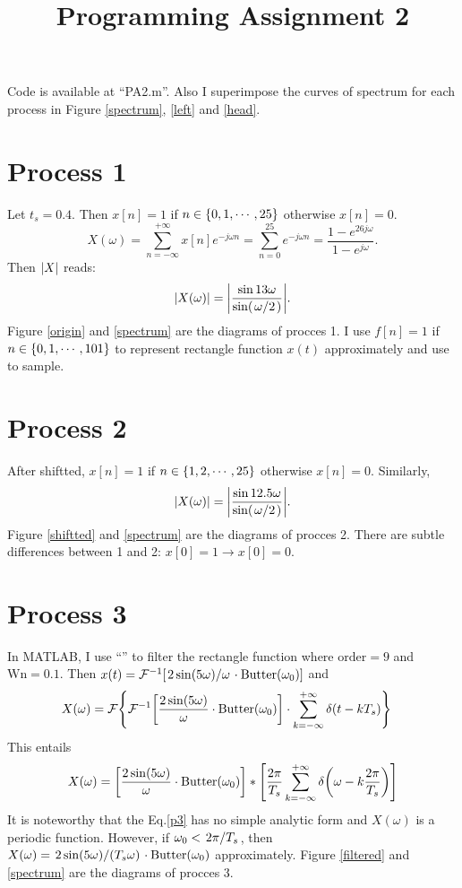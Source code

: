 \documentclass{article}
\begin{document}
\title{Programming Assignment 2}
Code is available at ``PA2.m''. Also I superimpose the curves of spectrum for each process in Figure \ref{spectrum}, \ref{left} and \ref{head}.

\section*{Process 1}
Let $t_s=0.4$. Then $x[n]=1$ if $n\in\qty{0,1,\cdots, 25}$ otherwise $x[n]=0$.
\[
	X(\omega)
	=
	\sum_{n=-\infty}^{+\infty} x[n]e^{-j\omega n}
	=
	\sum_{n=0}^{25} e^{-j\omega n}
	=
	\frac{1-e^{26j\omega}}{1-e^{j\omega}}
.\] 
Then $\qty|X|$ reads:
 \[
	 \abs{X(\omega)}=
	 \qty|\frac{\sin{13\omega}}{\sin(\flatfrac{\omega}{2})}|
.\] 
Figure \ref{origin} and \ref{spectrum} are the diagrams of procces 1. I use $f[n]=1$ if $n\in\qty{0,1,\cdots, 101}$ to represent rectangle function $x(t)$ approximately and use  to sample.


\section*{Process 2}
After shiftted, $x[n]=1$ if $n\in\qty{1,2, \cdots, 25}$ otherwise $x[n]=0$.
Similarly,
\[
	\abs{X(\omega)}=
	\qty|\frac{\sin{12.5\omega}}{\sin(\flatfrac{\omega}{2})}|
.\] 
Figure \ref{shiftted} and \ref{spectrum} are the diagrams of procces 2. There are subtle differences between 1 and 2: $x[0]=1\to x[0]=0$.


\section*{Process 3}
In MATLAB, I use ``'' to filter the rectangle function where $\mathrm{order}=9$ and  $\mathrm{Wn}=0.1$. Then $x(t)=\+F^{-1}\qty[\flatfrac{2\sin(5\omega)}{\omega}\cdot\mathrm{Butter}(\omega_0)]$ and 
\begin{equation}
	\begin{aligned}
		X(\omega)&=
		\mathcal{F}\qty{\mathcal{F}^{-1}\qty[\frac{2\sin(5\omega)}{\omega}\cdot\mathrm{Butter}(\omega_0)]
		\cdot
		\sum_{k=-\infty}^{+\infty} \delta(t-kT_s)}
	\end{aligned}
\end{equation}
This entails
\begin{equation}
	X(\omega)=\qty[\frac{2\sin(5\omega)}{\omega}\cdot\mathrm{Butter}(\omega_0)]*\qty[
			\frac{2\pi}{T_s}
			\sum_{k=-\infty}^{+\infty}
			\delta\qty(\omega-k\frac{2\pi}{T_s})
		]
	\label{p3}
\end{equation}
It is noteworthy that the Eq.\ref{p3} has no simple analytic form and $X(\omega)$ is a periodic function. However, if $\omega_0<\flatfrac{2\pi}{T_s}$, then $X(\omega)=\flatfrac{2\sin(5\omega)}{(T_s\omega)}\cdot\mathrm{Butter}(\omega_0)$ approximately.
Figure \ref{filtered} and \ref{spectrum} are the diagrams of procces 3.
\end{document}
